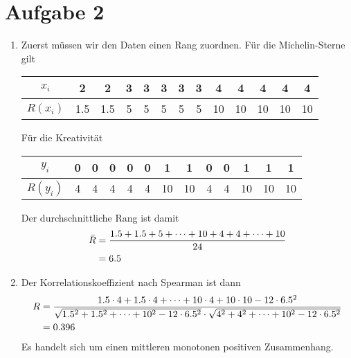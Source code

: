 \documentclass{article}
\begin{document}
	\section*{Aufgabe 2}
	\begin{enumerate}[label=(\alph*)]
		\item Zuerst müssen wir den Daten einen Rang zuordnen. Für die Michelin-Sterne gilt
		\begin{center}
			\begin{tabular}{c|cccccccccccc}
				$x_i$ & 2 & 2 & 3 & 3 & 3 & 3 & 3 & 4 & 4 & 4 & 4 & 4 \\
				\hline
				$R(x_i)$ & 1.5 & 1.5 & 5 & 5 & 5 & 5 & 5 & 10 & 10 & 10 & 10 & 10
			\end{tabular}
		\end{center}
		Für die Kreativität
		\begin{center}
			\begin{tabular}{c|cccccccccccc}
				$y_i$ & 0 & 0 & 0 & 0 & 0 & 1 & 1 & 0 & 0 & 1 & 1 & 1 \\
				\hline
				$R(y_i)$ & 4 & 4 & 4 & 4 & 4 & 10 & 10 & 4 & 4 & 10 & 10 & 10
			\end{tabular}
		\end{center}
		Der durchschnittliche Rang ist damit
		\begin{align}
			\bar{R} &= \frac{1.5 + 1.5 + 5 + \dots + 10 + 4 + 4 + \dots + 10}{24} \notag \\
			&= 6.5 \notag
		\end{align}
		\item Der Korrelationskoeffizient nach Spearman ist dann
		\begin{align}
			R &= \frac{1.5\cdot 4 + 1.5\cdot 4 + \dots + 10\cdot 4 + 10\cdot 10 - 12\cdot 6.5^2}{\sqrt{1.5^2 + 1.5^2 + \dots + 10^2 - 12\cdot 6.5^2}\cdot\sqrt{4^2 + 4^2 + \dots + 10^2 - 12\cdot 6.5^2}} \notag \\
			&= 0.396 \notag
		\end{align}
		Es handelt sich um einen mittleren monotonen positiven Zusammenhang.
	\end{enumerate}
\end{document}
